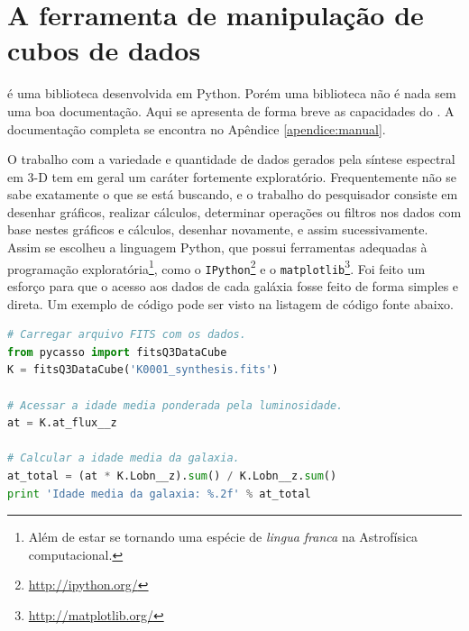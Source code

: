 
\section{A ferramenta de manipulação de cubos de dados \pycasso}
\label{sec:pycasso:Pycasso}

\pycasso é uma biblioteca desenvolvida em Python. Porém uma biblioteca não é nada
sem uma boa documentação. Aqui se apresenta de forma breve as capacidades do
\pycasso. A documentação completa se encontra no Apêndice \ref{apendice:manual}.

O trabalho com a variedade e quantidade de dados gerados pela síntese espectral
em 3-D tem em geral um caráter fortemente exploratório. Frequentemente não se
sabe exatamente o que se está buscando, e o trabalho do pesquisador consiste em
desenhar gráficos, realizar cálculos, determinar operações ou filtros nos dados
com base nestes gráficos e cálculos, desenhar novamente, e assim sucessivamente.
Assim se escolheu a linguagem Python, que possui ferramentas adequadas à
programação exploratória\footnote{Além de estar se tornando uma espécie de {\em
lingua franca} na Astrofísica computacional.}, como o
\texttt{IPython}\footnote{\url{http://ipython.org/}} e o
\texttt{matplotlib}\footnote{\url{http://matplotlib.org/}}. Foi feito um esforço
para que o acesso aos dados de cada galáxia fosse feito de forma simples e
direta. Um exemplo de código pode ser visto na listagem de código fonte abaixo.

\begin{lstlisting}[language=Python, label={lst:dataAccess}, caption={Exemplo de
acesso aos dados. Todas as propriedades estão disponíveis diretamente pelo nome,
inclusive utilizando a função autocompletar da maioria dos ambientes de
desenvolvimento Python.}]
# Carregar arquivo FITS com os dados.
from pycasso import fitsQ3DataCube
K = fitsQ3DataCube('K0001_synthesis.fits')

# Acessar a idade media ponderada pela luminosidade.
at = K.at_flux__z

# Calcular a idade media da galaxia.
at_total = (at * K.Lobn__z).sum() / K.Lobn__z.sum()
print 'Idade media da galaxia: %.2f' % at_total
\end{lstlisting}

